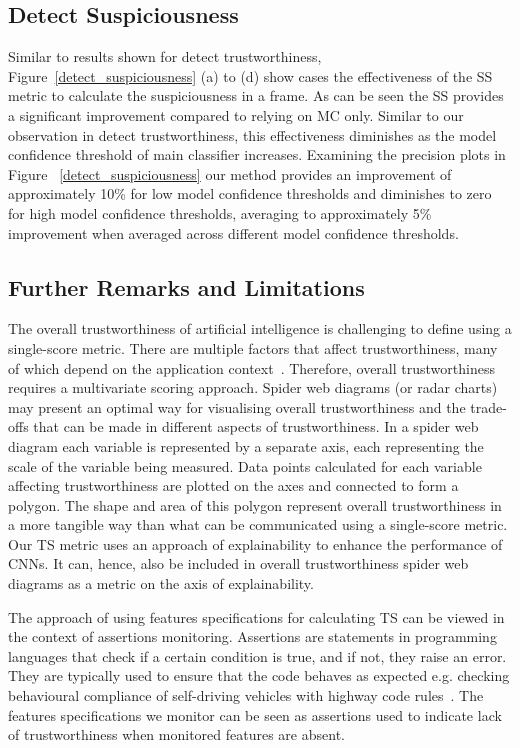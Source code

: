 \subsection{Detect Suspiciousness} 
Similar to results shown for detect trustworthiness, Figure~\ref{detect_suspiciousness} (a) to (d) show cases the effectiveness of the SS metric to calculate the suspiciousness in a frame. 
As can be seen the SS provides a significant improvement compared to relying on MC only. Similar to our observation in detect trustworthiness, this effectiveness diminishes as the model confidence threshold of main classifier increases.
%
Examining the precision plots in Figure ~\ref{detect_suspiciousness} our method provides an improvement of approximately 10\% for low model confidence thresholds and diminishes to zero for high model confidence thresholds, averaging to approximately 5\% improvement when averaged across different model confidence thresholds.

\subsection{Further Remarks and Limitations}
The overall trustworthiness of artificial intelligence is challenging to define using a single-score metric. 
%
There are multiple factors that affect trustworthiness, many of which depend on the application context~\cite{Wing2021,9142644,thiebes2021trustworthy}. 
%
Therefore, overall trustworthiness requires a multivariate scoring approach. Spider web diagrams (or radar charts) may present an optimal way for visualising overall trustworthiness and the trade-offs that can be made in different aspects of trustworthiness. 
%
In a spider web diagram each variable is represented by a separate axis, each representing the scale of the variable being measured.
%
Data points calculated for each variable affecting trustworthiness are plotted on the axes and connected to form a polygon.
%
The shape and area of this polygon represent overall trustworthiness in a more tangible way than what can be communicated  using a single-score metric.
%
Our TS metric uses an approach of explainability to enhance the performance of CNNs. It can, hence, also be included in overall trustworthiness spider web diagrams as a metric on the axis of explainability.

The approach of using features specifications for calculating TS can be viewed in the context of assertions monitoring. 
%
Assertions are statements in programming languages that check if a certain condition is true, and if not, they raise an error.
%
They are typically used to ensure that the code behaves as expected e.g. checking behavioural compliance of self-driving vehicles with highway code rules~\cite{harper2021safety}.
%
The features specifications we monitor can be seen as assertions used to indicate lack of trustworthiness when monitored features are absent.

